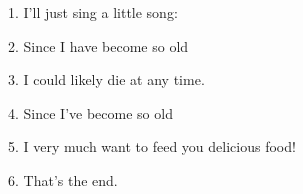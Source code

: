 \setcounter{footnote}{0}

1. I'll just sing a little song:

2. Since I have become so old

3. I could likely die at any time.

4. Since I've become so old

5. I very much want to feed you delicious food!

6. That's the end.

